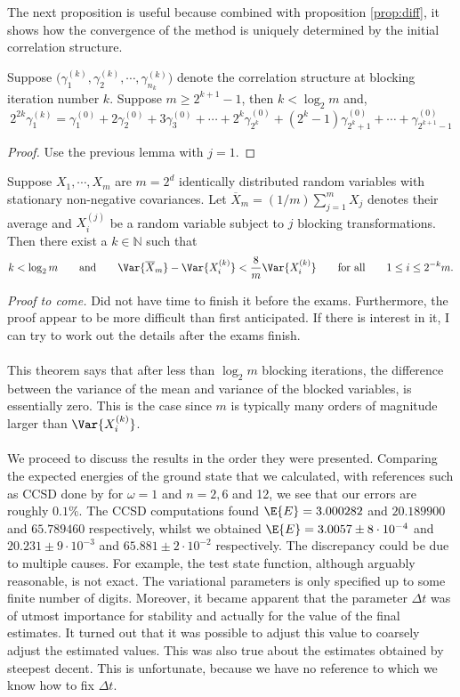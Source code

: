 \documentclass[11pt,english,a4paper]{article}
\begin{document}
The next proposition is useful because combined with proposition \ref{prop:diff}, it shows how the convergence of the method is uniquely determined by the initial correlation structure.
\begin{prop}
Suppose $\big(\gamma_1^{(k)} , \gamma_2^{(k)}, \cdots, \gamma_{n_k}^{(k)}\big)$ denote the correlation structure at blocking iteration number $k$. Suppose $m \geq 2^{k+1} - 1$, then $k < \log_2 m$ and,
\[
2^{  2k} \gamma_1^{(k)} = \gamma_1^{(0)} + 2\gamma_2^{(0)} + 3 \gamma_3^{(0)} + \cdots +2^k \gamma_{2^k}^{(0)} + (2^k-1)\gamma_{2^k+1}^{(0)} + \cdots + \gamma_{2^{k+1}-1}^{(0)}
\] \label{prop:sequence}
\end{prop}
\begin{proof}
Use the previous lemma with $j=1$.
\end{proof}
\begin{theorem}
Suppose $X_1,\cdots, X_m$ are $m = 2^d$ identically distributed random variables with stationary non-negative covariances. Let $\overline X_m = (1/m)\sum_{j=1}^m X_j$ denotes their average and $X^{(j)}_i$ be a random variable subject to $j$ blocking transformations. Then there exist a $k \in \mathbb{N}$ such that 
\[
k < \log_2 m \qquad \text{and} \qquad \Var{\overline X_m} - \Var{X^{(k)}_i} < \frac{8}{m}\Var{X^{(k)}_i} \qquad \text{for all} \qquad 1 \leq i \leq 2^{-k}m.
\]
\end{theorem}
\textit{Proof to come.} Did not have time to finish it before the exams. Furthermore, the proof appear to be more difficult than first anticipated. If there is interest in it, I can try to work out the details after the exams finish.\\
\\
This theorem says that after less than $\log_2 m$ blocking iterations, the difference between the variance of the mean and variance of the blocked variables, is essentially zero. This is the case since $m$ is typically many orders of magnitude larger than $\Var{X^{(k)}_i}$.\\
\\
We proceed to discuss the results in the order they were presented. Comparing the expected energies of the ground state that we calculated, with references such as CCSD done by \cite{m._pedersen_lohne_ab_2011} for $\omega = 1$ and $n = 2,6$ and 12, we see that our errors are roughly $0.1\%$. The CCSD computations found $\E{E} = 3.000282 $ and $20.189900$ and $65.789460$ respectively, whilst we obtained $\E{E} = 3.0057\pm 8\cdot 10^{-4} $ and $ 20.231\pm 9\cdot 10^{-3} $ and $ 65.881\pm 2\cdot 10^{-2}$ respectively. The discrepancy could be due to multiple causes. For example, the test state function, although arguably reasonable, is not exact. The variational parameters is only specified up to some finite number of digits. Moreover, it became apparent that the parameter $\Delta t$ was of utmost importance for stability and actually for the value of the final estimates. It turned out that it was possible to adjust this value to coarsely adjust the estimated values. This was also true about the estimates obtained by steepest decent. This is unfortunate, because we have no reference to which we know how to fix $\Delta t$.\\
\end{document}
